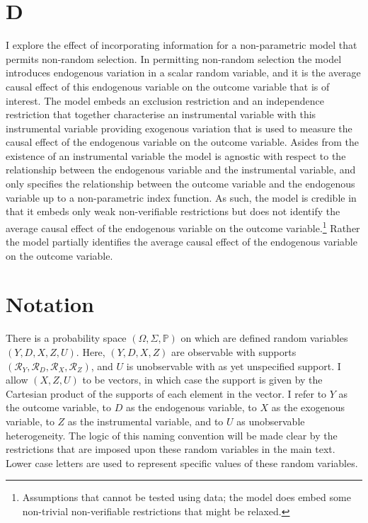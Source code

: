 \documentclass[10pt,a4paper,twoside]{article}
\numberwithin{equation}{subsection}
\begin{document}
\section{D}
I explore the effect of incorporating information for a non-parametric model that permits non-random selection. In permitting non-random selection the model introduces endogenous variation in a scalar random variable, and it is the average causal effect of this endogenous variable on the outcome variable that is of interest. The model embeds an exclusion restriction and an independence restriction that together characterise an instrumental variable with this instrumental variable providing exogenous variation that is used to measure the causal effect of the endogenous variable on the outcome variable. Asides from the existence of an instrumental variable the model is agnostic with respect to the relationship between the endogenous variable and the instrumental variable, and only specifies the relationship between the outcome variable and the endogenous variable up to a non-parametric index function. As such, the model is credible \citep{book.manski} in that it embeds only weak non-verifiable restrictions but does not identify the average causal effect of the endogenous variable on the outcome variable.\footnote{Assumptions that cannot be tested using data; the model does embed some non-trivial non-verifiable restrictions that might be relaxed.} Rather the model partially identifies the average causal effect of the endogenous variable on the outcome variable. 
\section*{Notation}
There is a probability space $(\Omega,\Sigma,\mathbb{P})$ on which are defined random variables $(Y,D,X,Z,U)$. Here, $(Y,D,X,Z)$ are observable with supports $(\mathcal{R}_Y,\mathcal{R}_D,\mathcal{R}_X,\mathcal{R}_Z)$, and $U$ is unobservable with as yet unspecified support. I allow $(X,Z,U)$ to be vectors, in which case the support is given by the Cartesian product of the supports of each element in the vector. I refer to $Y$ as the outcome variable, to $D$ as the endogenous variable, to $X$ as the exogenous variable, to $Z$ as the instrumental variable, and to $U$ as unobservable heterogeneity. The logic of this naming convention will be made clear by the restrictions that are imposed upon these random variables in the main text. Lower case letters are used to represent specific values of these random variables.
\end{document}
